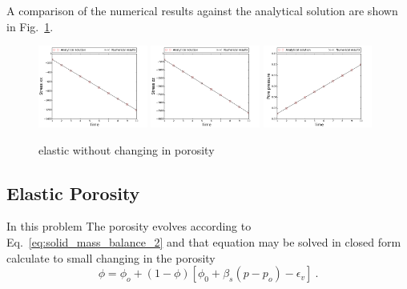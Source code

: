\documentclass[]{scrreprt}
\begin{document}
A comparison of the numerical results against the analytical solution are shown in Fig.~\ref{fig:benchmark7_no_porosity}.
\begin{figure}
  \label{fig:benchmark7_no_porosity}
  \centering
  \includegraphics[width=0.32\textwidth]{benchmark_7_HM/benchmark_7_HM_bench_HM_elastic_no_porosity_stress_xx}
  \includegraphics[width=0.32\textwidth]{benchmark_7_HM/benchmark_7_HM_bench_HM_elastic_no_porosity_stress_zz}
  \includegraphics[width=0.32\textwidth]{benchmark_7_HM/benchmark_7_HM_bench_HM_elastic_no_porosity_p0}
  \caption{elastic without changing in porosity}
 \end{figure}
 
\subsection{Elastic Porosity}
In this problem The porosity evolves according to Eq.~\ref{eq:solid_mass_balance_2} and that  equation may be solved in closed form calculate  to  small changing in the porosity \label{eq:material_derivative}
\begin{equation}
\label{eq:Evolution_of_Porosity}
\phi = \phi_o+(1-\phi) \left[ \phi_0+\beta_s (p-p_o) - \epsilon_v \right] \ .
\end{equation}
 
\end{document}
